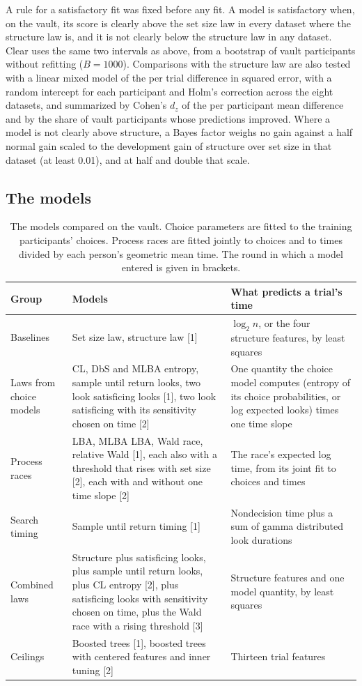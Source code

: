 \documentclass[11pt]{article}
\begin{document}
A rule for a satisfactory fit was fixed before any fit. A model is satisfactory when, on the vault, its score is clearly above the set size law in every dataset where the structure law is, and it is not clearly below the structure law in any dataset. Clear uses the same two intervals as above, from a bootstrap of vault participants without refitting ($B = 1000$). Comparisons with the structure law are also tested with a linear mixed model of the per trial difference in squared error, with a random intercept for each participant and Holm's correction across the eight datasets, and summarized by Cohen's $d_z$ of the per participant mean difference and by the share of vault participants whose predictions improved. Where a model is not clearly above structure, a Bayes factor weighs no gain against a half normal gain scaled to the development gain of structure over set size in that dataset (at least 0.01), and at half and double that scale.

\subsection{The models}
\label{sec:modellist}

\begin{table}[t]
\centering
\footnotesize
\setlength{\tabcolsep}{4pt}
\caption{The models compared on the vault. Choice parameters are fitted to the training participants' choices. Process races are fitted jointly to choices and to times divided by each person's geometric mean time. The round in which a model entered is given in brackets.}
\label{tab:models}
\begin{tabular}{p{2.6cm}p{6.2cm}p{6.6cm}}
\toprule
Group & Models & What predicts a trial's time \\
\midrule
Baselines & Set size law, structure law [1] & $\log_2 n$, or the four structure features, by least squares \\
Laws from choice models & CL, DbS and MLBA entropy, sample until return looks, two look satisficing looks [1], two look satisficing with its sensitivity chosen on time [2] & One quantity the choice model computes (entropy of its choice probabilities, or log expected looks) times one time slope \\
Process races & LBA, MLBA LBA, Wald race, relative Wald [1], each also with a threshold that rises with set size [2], each with and without one time slope [2] & The race's expected log time, from its joint fit to choices and times \\
Search timing & Sample until return timing [1] & Nondecision time plus a sum of gamma distributed look durations \\
Combined laws & Structure plus satisficing looks, plus sample until return looks, plus CL entropy [2], plus satisficing looks with sensitivity chosen on time, plus the Wald race with a rising threshold [3] & Structure features and one model quantity, by least squares \\
Ceilings & Boosted trees [1], boosted trees with centered features and inner tuning [2] & Thirteen trial features \\
\bottomrule
\end{tabular}
\end{table}
\end{document}
